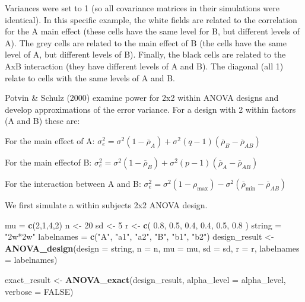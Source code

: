 \documentclass[]{book}
\newenvironment{Shaded}{\begin{snugshade}}{\end{snugshade}}
\newcommand{\DataTypeTok}[1]{\textcolor[rgb]{0.13,0.29,0.53}{#1}}
\newcommand{\DecValTok}[1]{\textcolor[rgb]{0.00,0.00,0.81}{#1}}
\newcommand{\FloatTok}[1]{\textcolor[rgb]{0.00,0.00,0.81}{#1}}
\newcommand{\KeywordTok}[1]{\textcolor[rgb]{0.13,0.29,0.53}{\textbf{#1}}}
\newcommand{\NormalTok}[1]{#1}
\newcommand{\OtherTok}[1]{\textcolor[rgb]{0.56,0.35,0.01}{#1}}
\newcommand{\StringTok}[1]{\textcolor[rgb]{0.31,0.60,0.02}{#1}}
\begin{document}
Variances were set to 1 (so all covariance matrices in their simulations were identical). In this specific example, the white fields are related to the correlation for the A main effect (these cells have the same level for B, but different levels of A). The grey cells are related to the main effect of B (the cells have the same level of A, but different levels of B). Finally, the black cells are related to the AxB interaction (they have different levels of A and B). The diagonal (all 1) relate to cells with the same levels of A and B.

Potvin \& Schulz (2000) examine power for 2x2 within ANOVA designs and develop approximations of the error variance. For a design with 2 within factors (A and B) these are:

For the main effect of A:
\(\sigma _ { e } ^ { 2 } = \sigma ^ { 2 } ( 1 - \overline { \rho } _ { A } ) + \sigma ^ { 2 } ( q - 1 ) ( \overline { \rho } _ { B } - \overline { \rho } _ { AB } )\)

For the main effectof B:
\(\sigma _ { e } ^ { 2 } = \sigma ^ { 2 } ( 1 - \overline { \rho } _ { B } ) + \sigma ^ { 2 } ( p - 1 ) ( \overline { \rho } _ { A } - \overline { \rho } _ { A B } )\)

For the interaction between A and B:
\(\sigma _ { e } ^ { 2 } = \sigma ^ { 2 } ( 1 - \rho _ { \max } ) - \sigma ^ { 2 } ( \overline { \rho } _ { \min } - \overline { \rho } _ { AB } )\)

We first simulate a within subjects 2x2 ANOVA design.

\begin{Shaded}
\begin{Highlighting}[]
\NormalTok{mu =}\StringTok{ }\KeywordTok{c}\NormalTok{(}\DecValTok{2}\NormalTok{,}\DecValTok{1}\NormalTok{,}\DecValTok{4}\NormalTok{,}\DecValTok{2}\NormalTok{) }
\NormalTok{n <-}\StringTok{ }\DecValTok{20}
\NormalTok{sd <-}\StringTok{ }\DecValTok{5}
\NormalTok{r <-}\StringTok{ }\KeywordTok{c}\NormalTok{(}
  \FloatTok{0.8}\NormalTok{, }\FloatTok{0.5}\NormalTok{, }\FloatTok{0.4}\NormalTok{,}
       \FloatTok{0.4}\NormalTok{, }\FloatTok{0.5}\NormalTok{,}
            \FloatTok{0.8}
\NormalTok{  )}
\NormalTok{string =}\StringTok{ "2w*2w"}
\NormalTok{labelnames =}\StringTok{ }\KeywordTok{c}\NormalTok{(}\StringTok{"A"}\NormalTok{, }\StringTok{"a1"}\NormalTok{, }\StringTok{"a2"}\NormalTok{, }\StringTok{"B"}\NormalTok{, }\StringTok{"b1"}\NormalTok{, }\StringTok{"b2"}\NormalTok{)}
\NormalTok{design_result <-}\StringTok{ }\KeywordTok{ANOVA_design}\NormalTok{(}\DataTypeTok{design =}\NormalTok{ string,}
                              \DataTypeTok{n =}\NormalTok{ n, }
                              \DataTypeTok{mu =}\NormalTok{ mu, }
                              \DataTypeTok{sd =}\NormalTok{ sd, }
                              \DataTypeTok{r =}\NormalTok{ r, }
                              \DataTypeTok{labelnames =}\NormalTok{ labelnames)}

\NormalTok{exact_result <-}\StringTok{ }\KeywordTok{ANOVA_exact}\NormalTok{(design_result,}
                            \DataTypeTok{alpha_level =}\NormalTok{ alpha_level,}
                            \DataTypeTok{verbose =} \OtherTok{FALSE}\NormalTok{)}
\end{Highlighting}
\end{Shaded}
\end{document}
